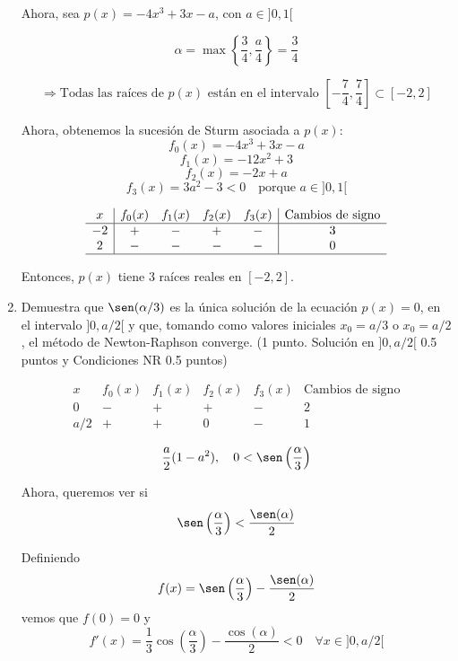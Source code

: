 \documentclass[12pt]{article}
\begin{document}
\begin{ejercicio}[4 puntos]
\begin{enumerate}
          Ahora, sea $p(x) = -4x^3 + 3x - a$, con $a \in ]0,1[$

          \[
          \alpha = \max\left\{ \frac{3}{4}, \frac{a}{4} \right\} = \frac{3}{4}
          \]

          \[
          \Rightarrow \text{Todas las raíces de } p(x) \text{ están en el intervalo }
          \left[ -\frac{7}{4}, \frac{7}{4} \right] \subset [-2, 2]
          \]

          Ahora, obtenemos la sucesión de Sturm asociada a $p(x)$:
          \[
          f_0(x) = -4x^3 + 3x - a
          \]
          \[
          f_1(x) = -12x^2 + 3
          \]
          \[
          f_2(x) = -2x + a
          \]
          \[
          f_3(x) = 3a^2 - 3 < 0 \quad \text{porque } a \in ]0,1[
          \]

          \[
          \begin{array}{c|cccc|c}
          x & f_0(x) & f_1(x) & f_2(x) & f_3(x) & \text{Cambios de signo} \\
          \hline
          -2 & + & - & + & - & 3 \\
          2 & - & - & - & - & 0 \\
          \hline
          \end{array}
          \]

          Entonces, \(p(x)\) tiene 3 raíces reales en \([-2,2]\).

          \item Demuestra que \( \sen(\alpha/3) \) es la única solución de la ecuación \( p(x) = 0 \), en el intervalo \( ]0, a/2[ \) y que, tomando como valores iniciales \( x_0 = a/3 \) o \( x_0 = a/2 \), el método de Newton-Raphson converge.
          (1 punto. Solución en $]0, a/2[$ 0.5 puntos y Condiciones NR 0.5 puntos)

          \[
          \begin{array}{c|cccc|c}
          x & f_0(x) & f_1(x) & f_2(x) & f_3(x) & \text{Cambios de signo} \\
          \hline
          0 & - & + & + & - & 2 \\
          a/2 & + & + & 0 & - & 1
          \end{array}
          \]

          \[
          \frac{a}{2} (1 - a^2), \quad 0 < \sen\left(\frac{\alpha}{3}\right)
          \]

          Ahora, queremos ver si $$\sen\left(\frac{\alpha}{3}\right) < \frac{\sen(\alpha)}{2}$$

          Definiendo $$f(x) = \sen\left(\frac{\alpha}{3}\right) - \frac{\sen(\alpha)}{2}$$ vemos que $f(0) = 0$ y $$f'(x) = \frac{1}{3} \cos\left(\frac{\alpha}{3}\right) - \frac{\cos(\alpha)}{2} < 0 \quad \forall x \in ]0, a/2[$$


\end{enumerate}
\end{ejercicio}
\end{document}
